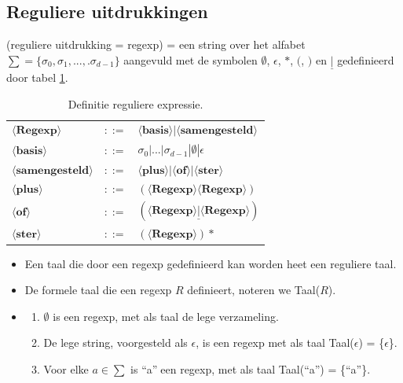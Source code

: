 \documentclass{report}
\begin{document}
\subsection{Reguliere uitdrukkingen}
(reguliere uitdrukking = regexp) = een string over het alfabet $\sum = \{\sigma_0, \sigma_1, ..., .\sigma_{d - 1}\}$ aangevuld met de symbolen $\emptyset$, $\epsilon$, $*$, $($, $)$ en $\underline{|}$ gedefinieerd door tabel \ref{table:regexp}.
\begin{table}[ht]
	\centering
	\begin{tabular}{l l l}
		$\langle \textbf{Regexp} \rangle$ & $::=$ & $\langle \textbf{basis} \rangle | \langle \textbf{samengesteld} \rangle$ \\
		$\langle \textbf{basis} \rangle$ & $::=$ & $\sigma_0 | ... | \sigma_{d - 1} | \emptyset | \epsilon$ \\
		$\langle \textbf{samengesteld} \rangle$ & $::=$ & $\langle \textbf{plus} \rangle  |  \langle \textbf{of} \rangle | \langle \textbf{ster} \rangle$ \\
		$\langle \textbf{plus} \rangle $ & $::=$ & $(\langle \textbf{Regexp} \rangle \langle \textbf{Regexp} \rangle)$ \\
		$\langle \textbf{of} \rangle $ & $::=$ & $(\langle \textbf{Regexp} \rangle \underline{|} \langle \textbf{Regexp} \rangle)$ \\
		$\langle \textbf{ster} \rangle $ & $::=$ & $(\langle \textbf{Regexp} \rangle)*$
	\end{tabular}
	\caption{Definitie reguliere expressie.}
	\label{table:regexp}
\end{table}
\begin{itemize}
	\item[\info] Een taal die door een regexp gedefinieerd kan worden heet een reguliere taal. 
	\item[\info] De formele taal die een regexp $R$ definieert, noteren we Taal($R$).
	\item[\info]
	\begin{enumerate}
		\item $\emptyset$ is een regexp, met als taal de lege verzameling.
		\item De lege string, voorgesteld als $\epsilon$, is een regexp met als taal Taal($\epsilon$) = \{$\epsilon$\}.
		\item Voor elke $a \in \sum$ is \textquotedblleft a\textquotedblright$\;$een regexp, met als taal Taal(\textquotedblleft a\textquotedblright ) = \{\textquotedblleft a\textquotedblright\}.
	\end{enumerate}
\end{itemize}
\end{document}
